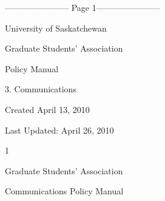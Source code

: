 ﻿----------------------- Page 1-----------------------

  

  

  

  

  

  

  

  

  

                                             University of Saskatchewan  

                                                                         

                                         Graduate Students’ Association  

  

  

  

  

  

  

  

  

  

  

  

  

  

  

  

  

  

                                                Policy Manual  

                                                        

                                           3. Communications  

  

  

Created April 13, 2010  

  

Last Updated: April 26, 2010  

                                                                  1  

                                               

                                             Graduate Students’ Association  

                                            Communications Policy Manual  

  



